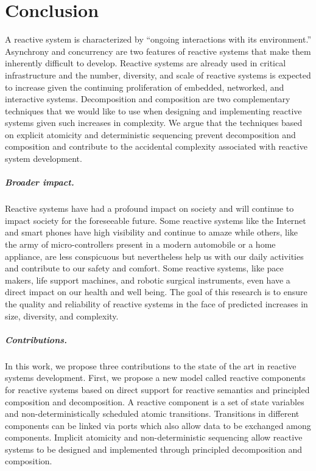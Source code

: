 \chapter{Conclusion}

A reactive system is characterized by ``ongoing interactions with its environment\cite{manna1992temporal}.''
Asynchrony and concurrency are two features of reactive systems that make them inherently difficult to develop.
Reactive systems are already used in critical infrastructure and the number, diversity, and scale of reactive systems is expected to increase given the continuing proliferation of embedded, networked, and interactive systems.
Decomposition and composition are two complementary techniques that we would like to use when designing and implementing reactive systems given such increases in complexity.
We argue that the techniques based on explicit atomicity and deterministic sequencing prevent decomposition and composition and contribute to the accidental complexity associated with reactive system development.

\paragraph{Broader impact.}
Reactive systems have had a profound impact on society and will continue to impact society for the foreseeable future.
Some reactive systems like the Internet and smart phones have high visibility and continue to amaze while others, like the army of micro-controllers present in a modern automobile or a home appliance, are less conspicuous but nevertheless help us with our daily activities and contribute to our safety and comfort.
Some reactive systems, like pace makers, life support machines, and robotic surgical instruments, even have a direct impact on our health and well being.
The goal of this research is to ensure the quality and reliability of reactive systems in the face of predicted increases in size, diversity, and complexity.

\paragraph{Contributions.}
In this work, we propose three contributions to the state of the art in reactive systems development.
First, we propose a new model called reactive components for reactive systems based on direct support for reactive semantics and principled composition and decomposition.
A reactive component is a set of state variables and non-deterministically scheduled atomic transitions.
Transitions in different components can be linked via ports which also allow data to be exchanged among components.
Implicit atomicity and non-deterministic sequencing allow reactive systems to be designed and implemented through principled decomposition and composition.

